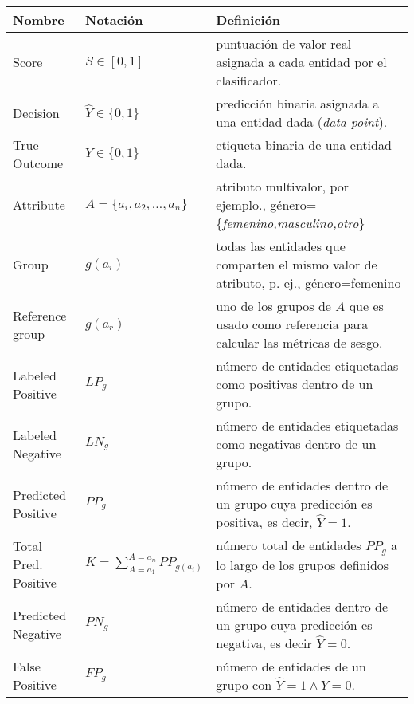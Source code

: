 \begin{table}[h]
\centering
\resizebox{17.0cm}{!} {
\begin{tabular}{lll}
\hline
Nombre               & Notación                             & Definición                                                                                      \\ \hline
Score                & $S\in [0,1]$                         & puntuación de valor real asignada a cada entidad por el clasificador.                           \\
Decision             & $\hat{Y}\in \{0,1\}$                 & predicción binaria asignada a una entidad dada (\textit{data point}).          \\
True Outcome         & $Y\in \{0,1\}$                       & etiqueta binaria de una entidad dada.                                                           \\
Attribute            & $A=\{ a_i,a_2,\dots,a_n\}$           & atributo multivalor, por ejemplo., género=\{\textit{femenino,masculino,otro}\} \\
Group                & $g(a_i)$                             & todas las entidades que comparten el mismo valor de atributo, p. ej., género=femenino           \\
Reference group      & $g(a_r)$                             & uno de los grupos de $A$ que es usado como referencia para calcular las métricas de sesgo.      \\
Labeled Positive     & $LP_g$                               & número de entidades etiquetadas como positivas dentro de un grupo.                              \\
Labeled Negative     & $LN_g$                               & número de entidades etiquetadas como negativas dentro de un grupo.                              \\
Predicted Positive   & $PP_g$                               & número de entidades dentro de un grupo cuya predicción es positiva, es decir, $\hat{Y}=1$.        \\
Total Pred. Positive & $K=\sum_{A=a_1}^{A=a_n} PP_{g(a_i)}$ & número total de entidades $PP_g$ a lo largo de los grupos definidos por $A$.                    \\
Predicted Negative   & $PN_g$                               & número de entidades dentro de un grupo cuya predicción es negativa, es decir $\hat{Y}=0$.         \\
False Positive       & $FP_g$                               & número de entidades de un grupo con $\hat{Y}=1 \wedge Y=0$.                                     \\

\end{tabular}}
\end{table}
